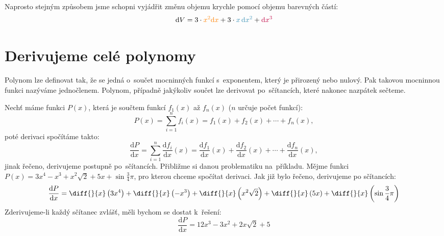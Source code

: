 Naprosto stejným způsobem jsme schopni vyjádřit změnu objemu krychle pomocí objemu barevných částí:
\begin{equation*}
    \text{d}V = 3 \cdot {\color{orange} x^2 \text{d}x} + 3 \cdot {\color{cyan!70!black} x \, \text{d}x^2} + {\color{purple} \text{d}x^3}
\end{equation*}

\vfill{}
\pagebreak
\section{Derivujeme celé polynomy}

Polynom lze definovat tak, že se jedná o~součet mocninných funkcí s~exponentem, který je přirozený nebo nulový. Pak takovou mocninnou funkci nazýváme jednočlenem. Polynom, případně jakýkoliv součet lze derivovat po~sčítancích, které nakonec nazpátek sečteme.

Nechť máme funkci $P(x)$, která je součtem funkcí $f_1(x)$ až $f_n(x)$ ($n$ určuje počet funkcí):
\begin{equation*}
    P(x) = \sum_{i = 1}^n f_i(x) = f_1(x) + f_2(x) + \cdots + f_n(x),
\end{equation*}
poté derivaci spočítáme takto:
\begin{equation*}
    \frac{\text{d}P}{\text{d}x} = \sum_{i = 1}^n \frac{\text{d}f_i}{\text{d}x}(x)
    = \frac{\text{d}f_1}{\text{d}x}(x)
    + \frac{\text{d}f_2}{\text{d}x}(x)
    + \cdots + \frac{\text{d}f_n}{\text{d}x}(x),
\end{equation*}
jinak řečeno, derivujeme postupně po~sčítancích. Přibližme si danou problematiku na~příkladu. Mějme funkci $P(x) = 3x^4 - x^3 + x^2 \sqrt2 + 5x + \sin \frac34 \pi$, pro kterou chceme spočítat derivaci. Jak již bylo řečeno, derivujeme po sčítancích:
\begin{equation*}
    \frac{\text{d}P}{\text{d}x}
    = \diff{}{x} \left( 3x^4 \right)
    + \diff{}{x} \left( -x^3 \right)
    + \diff{}{x} \left( x^2 \sqrt2 \right)
    + \diff{}{x} \left( 5x \right)
    + \diff{}{x} \left( \sin \frac34 \pi \right)
\end{equation*}
Zderivujeme-li každý sčítanec zvlášť, měli bychom se dostat k~řešení:
\begin{equation*}
    \frac{\text{d}P}{\text{d}x} = 12x^3 - 3x^2 + 2x \sqrt2 + 5
\end{equation*}

